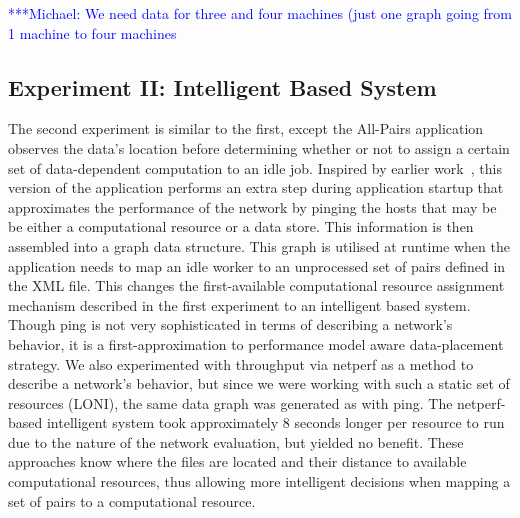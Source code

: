 \documentclass{rspublic}
\newcommand{\micnote}[1]{ {\textcolor{blue} { ***Michael: #1 }}}
\newcommand{\betynote}[1]{ {\textcolor{orange} { ***Bety: #1 }}}
\newcommand{\jhanote}[1]{} \newcommand{\micnote}[1]{}\newcommand{\betynote}[1]{} \newcommand{\fixme}[1]{}
\begin{document}
\jhanote{We need data for compute (comparison) and I/O (only) for
different data-set sizes} \micnote{We need data for three and four
machines (just one graph going from 1 machine to four machines}

\subsection{Experiment II: Intelligent Based System}
The second experiment is similar to the first, except the All-Pairs
application observes the data's location before determining whether or
not to assign a certain set of data-dependent computation to an idle
job. Inspired by earlier work~\citep{netperf}, this version of the
application performs an extra step during application startup that
approximates the performance of the network by pinging the hosts that
may be be either a computational resource or a data store. This
information is then assembled into a graph data structure. This graph
is utilised at runtime when the application needs to map an idle worker
to an unprocessed set of pairs defined in the XML file. This changes the
first-available computational resource assignment mechanism described in
the first experiment to an intelligent based system. Though ping is not
very sophisticated in terms of describing a network's behavior, it is a
first-approximation to performance model aware data-placement strategy.
We also experimented with throughput via netperf \jhanote{citation
needed} as a method to describe a network's behavior, but since we were
working with such a static set of resources (LONI), the same data graph
was generated as with ping. The netperf-based intelligent system took
approximately 8 seconds longer per resource to run due to the nature of
the network evaluation, but yielded no benefit. These approaches know
where the files are located and their distance to available
computational resources, thus allowing more intelligent decisions when
mapping a set of pairs to a computational resource.

 \jhanote{Data-aware
placement is also required, i.e., managing location of files.} 
\end{document}

